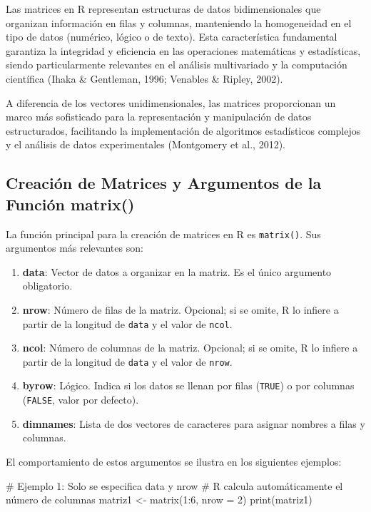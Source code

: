\documentclass[
  spanish,
  a4paper,
  DIV=11,
  numbers=noendperiod,
  onepage,
  openany]{scrreprt}
\newenvironment{Shaded}{\begin{snugshade}}{\end{snugshade}}
\newcommand{\AttributeTok}[1]{\textcolor[rgb]{0.40,0.45,0.13}{#1}}
\newcommand{\CommentTok}[1]{\textcolor[rgb]{0.37,0.37,0.37}{#1}}
\newcommand{\DecValTok}[1]{\textcolor[rgb]{0.68,0.00,0.00}{#1}}
\newcommand{\FunctionTok}[1]{\textcolor[rgb]{0.28,0.35,0.67}{#1}}
\newcommand{\NormalTok}[1]{\textcolor[rgb]{0.00,0.23,0.31}{#1}}
\newcommand{\OtherTok}[1]{\textcolor[rgb]{0.00,0.23,0.31}{#1}}
\newcommand{\SpecialCharTok}[1]{\textcolor[rgb]{0.37,0.37,0.37}{#1}}
\begin{document}
Las matrices en R representan estructuras de datos bidimensionales que
organizan información en filas y columnas, manteniendo la homogeneidad
en el tipo de datos (numérico, lógico o de texto). Esta característica
fundamental garantiza la integridad y eficiencia en las operaciones
matemáticas y estadísticas, siendo particularmente relevantes en el
análisis multivariado y la computación científica (Ihaka \& Gentleman,
1996; Venables \& Ripley, 2002).

A diferencia de los vectores unidimensionales, las matrices proporcionan
un marco más sofisticado para la representación y manipulación de datos
estructurados, facilitando la implementación de algoritmos estadísticos
complejos y el análisis de datos experimentales (Montgomery et al.,
2012).

\subsection{Creación de Matrices y Argumentos de la Función
matrix()}\label{creaciuxf3n-de-matrices-y-argumentos-de-la-funciuxf3n-matrix}

La función principal para la creación de matrices en R es
\texttt{matrix()}. Sus argumentos más relevantes son:

\begin{enumerate}
\def\labelenumi{\arabic{enumi}.}
\item
  \textbf{data}: Vector de datos a organizar en la matriz. Es el único
  argumento obligatorio.
\item
  \textbf{nrow}: Número de filas de la matriz. Opcional; si se omite, R
  lo infiere a partir de la longitud de \texttt{data} y el valor de
  \texttt{ncol}.
\item
  \textbf{ncol}: Número de columnas de la matriz. Opcional; si se omite,
  R lo infiere a partir de la longitud de \texttt{data} y el valor de
  \texttt{nrow}.
\item
  \textbf{byrow}: Lógico. Indica si los datos se llenan por filas
  (\texttt{TRUE}) o por columnas (\texttt{FALSE}, valor por defecto).
\item
  \textbf{dimnames}: Lista de dos vectores de caracteres para asignar
  nombres a filas y columnas.
\end{enumerate}

El comportamiento de estos argumentos se ilustra en los siguientes
ejemplos:

\begin{Shaded}
\begin{Highlighting}[]
\CommentTok{\# Ejemplo 1: Solo se especifica data y nrow}
\CommentTok{\# R calcula automáticamente el número de columnas}
\NormalTok{matriz1 }\OtherTok{\textless{}{-}} \FunctionTok{matrix}\NormalTok{(}\DecValTok{1}\SpecialCharTok{:}\DecValTok{6}\NormalTok{, }\AttributeTok{nrow =} \DecValTok{2}\NormalTok{)}
\FunctionTok{print}\NormalTok{(matriz1)}
\end{Highlighting}
\end{Shaded}
\end{document}
